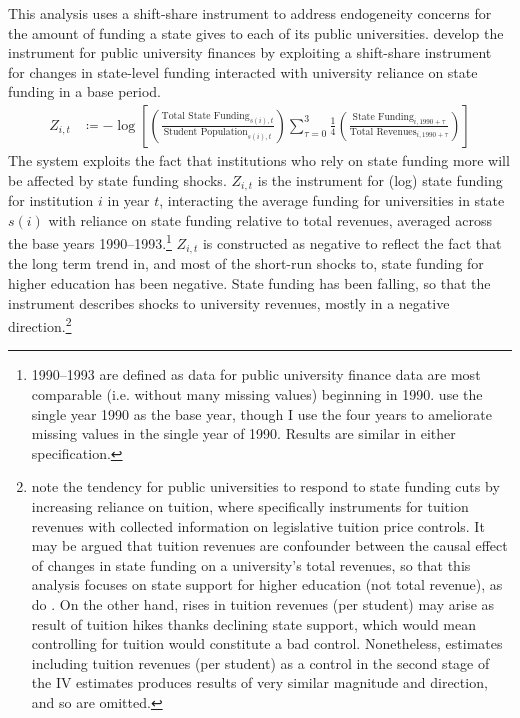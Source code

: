 This analysis uses a shift-share instrument to address endogeneity concerns for the amount of funding a state gives to each of its public universities.
\cite{NBERw23736,NBERw27885} develop the instrument for public university finances by exploiting a shift-share instrument for changes in state-level funding interacted with university reliance on state funding in a base period.
\begin{align}
    \label{eqn:public-instrument}
    Z_{i,t} &\coloneqq - \log \left[
    \left( \frac{\text{Total State Funding}_{s(i),t}}{\text{Student Population}_{s(i),t}} \right)
    \sum_{\tau = 0}^{3} \frac 14
    \left( \frac{\text{State Funding}_{i,1990 + \tau}}{\text{Total Revenues}_{i,1990 + \tau}} \right) \right]
\end{align}
The system exploits the fact that institutions who rely on state funding more will be affected by state funding shocks.
$Z_{i,t}$ is the instrument for (log) state funding for institution $i$ in year $t$, interacting the average funding for universities in state $s(i)$ with reliance on state funding relative to total revenues, averaged across the base years 1990--1993.\footnote{
    1990--1993 are defined as data for public university finance data are most comparable (i.e. without many missing values) beginning in 1990.
    \cite{NBERw23736} use the single year 1990 as the base year, though I use the four years to ameliorate missing values in the single year of 1990.
    Results are similar in either specification.
}
$Z_{i,t}$ is constructed as negative to reflect the fact that the long term trend in, and most of the short-run shocks to, state funding for higher education has been negative.
State funding has been falling, so that the instrument describes shocks to university revenues, mostly in a negative direction.\footnote{
    \label{foot:control}
    \cite{NBERw27885} note the tendency for public universities to respond to state funding cuts by increasing reliance on tuition, where \cite{NBERw23736} specifically instruments for tuition revenues with collected information on legislative tuition price controls.
    It may be argued that tuition revenues are confounder between the causal effect of changes in state funding on a university's total revenues, so that this analysis focuses on state support for higher education (not total revenue), as do \cite{NBERw27885}.
    On the other hand, rises in tuition revenues (per student) may arise as result of tuition hikes thanks declining state support, which would mean controlling for tuition would constitute a bad control.
    Nonetheless, estimates including tuition revenues (per student) as a control in the second stage of the IV estimates produces results of very similar magnitude and direction, and so are omitted.
}
